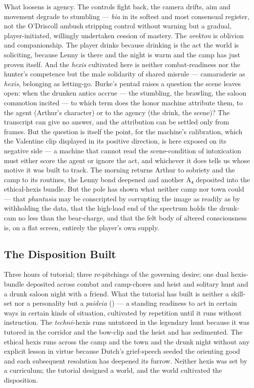What loosens is agency. The controls fight back, the camera drifts, aim and movement degrade to stumbling — \textit{bia} in its softest and most consensual register, not the O'Driscoll ambush stripping control without warning but a gradual, player-initiated, willingly undertaken cession of mastery. The \textit{orekton} is oblivion and companionship. The player drinks because drinking is the act the world is soliciting, because Lenny is there and the night is warm and the camp has just proven itself. And the \textit{hexis} cultivated here is neither combat-readiness nor the hunter's competence but the male solidarity of shared misrule — camaraderie as \textit{hexis}, belonging as letting-go. Burke's pentad raises a question the scene leaves open: when the drunken antics accrue — the stumbling, the brawling, the saloon commotion incited — to which term does the honor machine attribute them, to the agent (Arthur's character) or to the agency (the drink, the scene)? The transcript can give no answer, and the attribution can be settled only from frames. But the question is itself the point, for the machine's calibration, which the Valentine clip displayed in its positive direction, is here exposed on its negative side — a machine that cannot read the scene-condition of intoxication must either score the agent or ignore the act, and whichever it does tells us whose motive it was built to track. The morning returns Arthur to sobriety and the camp to its routines, the Lenny bond deepened and another A₄ deposited into the ethical-hexis bundle. But the pole has shown what neither camp nor town could — that \textit{phantasia} may be conscripted by corrupting the image as readily as by withholding the data, that the high-load end of the spectrum holds the drunk-cam no less than the bear-charge, and that the felt body of altered consciousness is, on a flat screen, entirely the player's own supply.

\bigskip

\subsection*{The Disposition Built}

Three hours of tutorial; three re-pitchings of the governing desire; one dual hexis-bundle deposited across combat and camp-chores and heist and solitary hunt and a drunk saloon night with a friend. What the tutorial has built is neither a skill-set nor a personality but a \textit{paideia} () — a standing readiness to act in certain ways in certain kinds of situation, cultivated by repetition until it runs without instruction. The \textit{technē}-hexis runs untutored in the legendary hunt because it was tutored in the corridor and the bow-clip and the heist and has sedimented. The ethical hexis runs across the camp and the town and the drunk night without any explicit lesson in virtue because Dutch's grief-speech seeded the orienting good and each subsequent resolution has deepened its furrow. Neither hexis was set by a curriculum; the tutorial designed a world, and the world cultivated the disposition.

